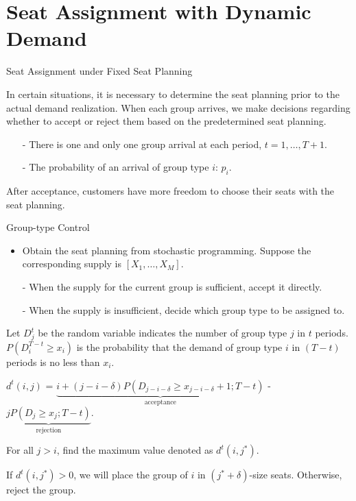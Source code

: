 
\section{Seat Assignment with Dynamic Demand}
    \frame{\sectionpage}

  \begin{frame}{Seat Assignment under Fixed Seat Planning}

    In certain situations, it is necessary to determine the seat planning prior to the actual demand realization. When each group arrives, we make decisions regarding whether to accept or reject them based on the predetermined seat planning.
    \vspace{0.5cm}
    
    \begin{itemize}
      \item[-] There is one and only one group arrival at each period, $t = 1, \ldots, T+1$. 
      \item[-] The probability of an arrival of group type $i$: $p_i$.  
    \end{itemize}

    After acceptance, customers have more freedom to choose their seats with the seat planning.
  \end{frame}
  
  \begin{frame}{Group-type Control}
    \begin{itemize}
      \item Obtain the seat planning from stochastic programming. Suppose the corresponding supply is $[X_1, \ldots, X_M]$. 
      \item[-] When the supply for the current group is sufficient, accept it directly.
      \item[-] When the supply is insufficient, decide which group type to be assigned to.
    \end{itemize}
    \scriptsize
    \vspace{0.5cm}
    Let $D^t_j$ be the random variable indicates the number of group type $j$ in $t$ periods.
    $P(D_{i}^{T-t} \geq x_i)$ is the probability that the demand of group type $i$ in $(T - t)$ periods is no less than $x_i$.

    $d^{t}(i, j)$ = $\underbrace{i + (j-i-\delta)P(D_{j-i-\delta} \geq x_{j-i-\delta}+1; T-t)}_{\text{acceptance}}$ - $\underbrace{j P(D_{j} \geq x_{j}; T-t)}_{\text{rejection}}.$

    For all $j > i$, find the maximum value denoted as $d^{t}(i, j^{*})$.
    
    If $d^{t}(i, j^{*}) > 0$, we will place the group of $i$ in $(j^{*} + \delta)$-size seats. Otherwise, reject the group.
  \end{frame}

